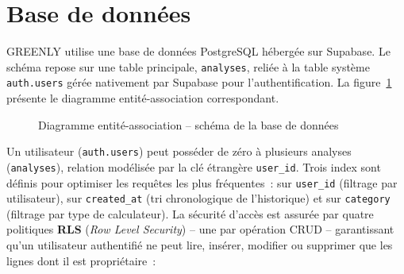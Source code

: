 \section{Base de données}

GREENLY utilise une base de données PostgreSQL hébergée sur Supabase. Le schéma repose sur une table principale, \texttt{analyses}, reliée à la table système \texttt{auth.users} gérée nativement par Supabase pour l'authentification. La figure~\ref{fig:erd} présente le diagramme entité-association correspondant.

\begin{figure}[H]
\centering
{}
\caption{Diagramme entité-association -- schéma de la base de données}
\label{fig:erd}
\end{figure}

Un utilisateur (\texttt{auth.users}) peut posséder de zéro à plusieurs analyses (\texttt{analyses}), relation modélisée par la clé étrangère \texttt{user\_id}. Trois index sont définis pour optimiser les requêtes les plus fréquentes~: sur \texttt{user\_id} (filtrage par utilisateur), sur \texttt{created\_at} (tri chronologique de l'historique) et sur \texttt{category} (filtrage par type de calculateur). La sécurité d'accès est assurée par quatre politiques \textbf{RLS} (\textit{Row Level Security}) -- une par opération CRUD -- garantissant qu'un utilisateur authentifié ne peut lire, insérer, modifier ou supprimer que les lignes dont il est propriétaire~:

